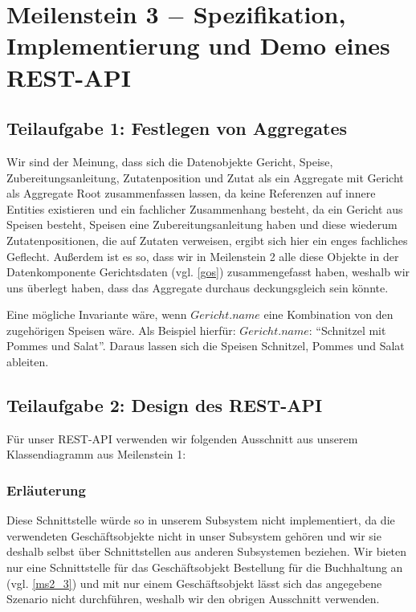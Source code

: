 \section{Meilenstein 3 $-$ Spezifikation, Implementierung
  und Demo eines REST-API}

\subsection{Teilaufgabe 1: Festlegen von Aggregates}%
\label{ms3_aggregates}



Wir sind der Meinung, dass sich die Datenobjekte Gericht,
Speise, Zubereitungsanleitung, Zutatenposition und Zutat
als ein Aggregate mit Gericht als Aggregate Root
zusammenfassen lassen, da keine Referenzen auf innere
Entities existieren und ein fachlicher Zusammenhang
besteht, da ein Gericht aus Speisen besteht, Speisen eine
Zubereitungsanleitung haben und diese wiederum
Zutatenpositionen, die auf Zutaten verweisen, ergibt sich
hier ein enges fachliches Geflecht. Au{\ss}erdem ist es so,
dass wir in Meilenstein 2 alle diese Objekte in der
Datenkomponente Gerichtsdaten (vgl. \ref{gos})
zusammengefasst haben, weshalb wir uns \"uberlegt haben,
dass das Aggregate durchaus deckungsgleich sein k\"onnte.

Eine m\"ogliche Invariante w\"are, wenn $Gericht.name$ eine
Kombination von den zugeh\"origen Speisen w\"are. Als
Beispiel hierf\"ur: $Gericht.name$: "`Schnitzel mit Pommes
und Salat"'. Daraus lassen sich die Speisen Schnitzel,
Pommes und Salat ableiten.

\subsection{Teilaufgabe 2: Design des REST-API}

F\"ur unser REST-API verwenden wir folgenden Ausschnitt aus
unserem Klassendiagramm aus Meilenstein 1:



\subsubsection*{Erl\"auterung}

Diese Schnittstelle w\"urde so in unserem Subsystem nicht
implementiert, da die verwendeten Gesch\"aftsobjekte nicht
in unser Subsystem geh\"oren und wir sie deshalb selbst
\"uber Schnittstellen aus anderen Subsystemen beziehen.
Wir bieten nur eine Schnittstelle f\"ur das
Gesch\"aftsobjekt Bestellung f\"ur die Buchhaltung an (vgl.
\ref{ms2_3}) und mit nur einem Gesch\"aftsobjekt l\"asst
sich das angegebene Szenario nicht durchf\"uhren, weshalb
wir den obrigen Ausschnitt verwenden.


